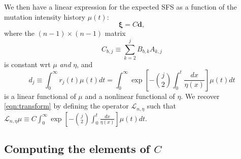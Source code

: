 We then have a linear expression for the expected SFS as a function of the mutation intensity history $\mu(t)$:
\begin{equation}
\label{eqn:xivec}
\boldsymbol\xi = C \boldsymbol d,
\end{equation}
where the $(n-1)\times(n-1)$ matrix
\[
C_{b,j} \equiv \sum_{k=2}^j B_{b,k} A_{k,j}
\]
is constant wrt $\mu$ \emph{and} $\eta$, and
\begin{equation}
\label{eqn:d}
d_j \equiv \int_0^\infty r_j(t)\mu(t)dt = \int_0^\infty \exp\left[-\binom{j}{2}\int_0^t\frac{dx}{\eta(x)}\right]\mu(t)dt
\end{equation}
is a linear functional of $\mu$ and a nonlinear functional of $\eta$.
We recover \ref{eqn:transform} by defining the operator $\mathcal{L}_{n,\eta}$ such that $\mathcal{L}_{n,\eta}\mu \equiv C \int_0^\infty \exp\left[-\binom{j}{2}\int_0^t\frac{dx}{\eta(x)}\right]\mu(t)dt$.

\subsection{Computing the elements of $C$}\label{sec:appendix:C}

